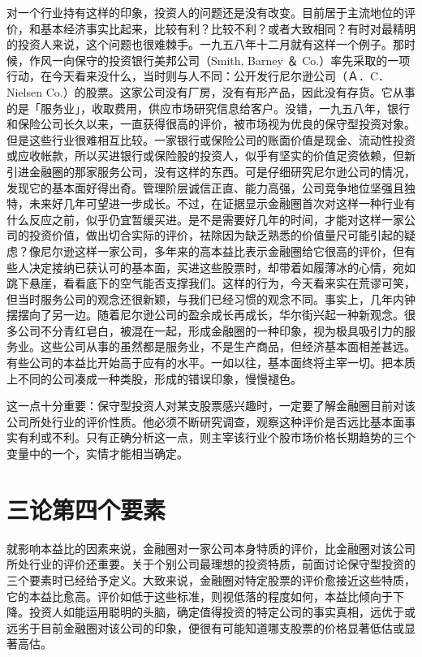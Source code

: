 \documentclass[UTF8,a4paper,zihao=-4,fontset = windows]{ctexart} %
\begin{document}
对一个行业持有这样的印象，投资人的问题还是没有改变。目前居于主流地位的评价，和基本经济事实比起来，比较有利？比较不利？或者大致相同？有时对最精明的投资人来说，这个问题也很难棘手。一九五八年十二月就有这样一个例子。那时候，作风一向保守的投资银行美邦公司（Smith, Barney ＆ Co.）率先采取的一项行动，在今天看来没什么，当时则与人不同：公开发行尼尔逊公司（Ａ．C．Nielsen Co.）的股票。这家公司没有厂房，没有有形产品，因此没有存货。它从事的是「服务业」，收取费用，供应市场研究信息给客户。没错，一九五八年，银行和保险公司长久以来，一直获得很高的评价，被市场视为优良的保守型投资对象。但是这些行业很难相互比较。一家银行或保险公司的账面价值是现金、流动性投资或应收帐款，所以买进银行或保险股的投资人，似乎有坚实的价值足资依赖，但新引进金融圈的那家服务公司，没有这样的东西。可是仔细研究尼尔逊公司的情况，发现它的基本面好得出奇。管理阶层诚信正直、能力高强，公司竞争地位坚强且独特，未来好几年可望进一步成长。不过，在证据显示金融圈首次对这样一种行业有什么反应之前，似乎仍宜暂缓买进。是不是需要好几年的时间，才能对这样一家公司的投资价值，做出切合实际的评价，袪除因为缺乏熟悉的价值量尺可能引起的疑虑？像尼尔逊这样一家公司，多年来的高本益比表示金融圈给它很高的评价，但有些人决定接纳已获认可的基本面，买进这些股票时，却带着如履薄冰的心情，宛如跳下悬崖，看看底下的空气能否支撑我们。这样的行为，今天看来实在荒谬可笑，但当时服务公司的观念还很新颖，与我们已经习惯的观念不同。事实上，几年内钟摆摆向了另一边。随着尼尔逊公司的盈余成长再成长，华尔街兴起一种新观念。很多公司不分青红皂白，被混在一起，形成金融圈的一种印象，视为极具吸引力的服务业。这些公司从事的虽然都是服务业，不是生产商品，但经济基本面相差甚远。有些公司的本益比开始高于应有的水平。一如以往，基本面终将主宰一切。把本质上不同的公司凑成一种类股，形成的错误印象，慢慢褪色。

这一点十分重要：保守型投资人对某支股票感兴趣时，一定要了解金融圈目前对该公司所处行业的评价性质。他必须不断研究调查，观察这种评价是否远比基本面事实有利或不利。只有正确分析这一点，则主宰该行业个股市场价格长期趋势的三个变量中的一个，实情才能相当确定。

\section{三论第四个要素}

就影响本益比的因素来说，金融圈对一家公司本身特质的评价，比金融圈对该公司所处行业的评价还重要。关于个别公司最理想的投资特质，前面讨论保守型投资的三个要素时已经给予定义。大致来说，金融圈对特定股票的评价愈接近这些特质，它的本益比愈高。评价如低于这些标准，则视低落的程度如何，本益比倾向于下降。投资人如能运用聪明的头脑，确定值得投资的特定公司的事实真相，远优于或远劣于目前金融圈对该公司的印象，便很有可能知道哪支股票的价格显著低估或显著高估。
\end{document}
